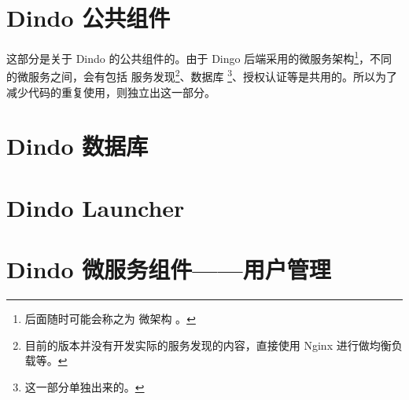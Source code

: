 \documentclass{dingo}
\begin{document}
  \section{Dindo 公共组件}
  这部分是关于 Dindo 的公共组件的。由于 Dingo 后端采用的微服务架构\footnote{后面随时可能会称之为 微架构 。}，不同的微服务之间，会有包括
  服务发现\footnote{目前的版本并没有开发实际的服务发现的内容，直接使用 Nginx 进行做均衡负载等。}、数据库
  \footnote{这一部分单独出来的。}、授权认证等是共用的。所以为了减少代码的重复使用，则独立出这一部分。
  
  \section{Dindo 数据库}
  
  \section{Dindo Launcher}
  
  \section{Dindo 微服务组件——用户管理}
\end{document}
